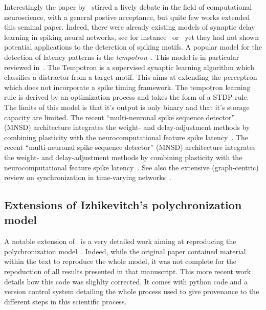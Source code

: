 \documentclass[brainsci, %
               review,submit,pdftex,moreauthors%
               ]{Definitions/mdpi}
\begin{document}
Interestingly the paper by~\citet{izhikevich_polychronization_2006} stirred a lively debate in the field of computational neuroscience, with a general postive acceptance, but quite few works extended this seminal paper.
Indeed, there were already existing models of synaptic delay learning in spiking neural networks, see for instance~\citep{huning_synaptic_1998} or~\citep{eurich_dynamics_1999} yet they had not shown potential applications to the deterction of spiking motifs. A popular model for the detection of latency patterns is the \emph{tempotron}~\citep{gutig_tempotron_2006}. This model is in particular reviewed in~\citep{gutig_spike_2014}. The Tempotron is a supervised synaptic learning algorithm which classifies a distractor from a target motif. This aims at extending the perceptron which does not incorporate a spike timing framework. The tempotron learning rule is derived by an optimization process and takes the form of a STDP rule.  The limits of this model is that it's output is only binary and that it's storage capacity are limited.
The recent ``multi-neuronal spike sequence detector'' (MNSD) architecture integrates the weight- and delay-adjustment methods by combining plasticity with the neurocomputational feature spike latency~\citep{susi_nmnsd-spiking_2021}.
The recent ``multi-neuronal spike sequence detector'' (MNSD) architecture integrates the weight- and delay-adjustment methods by combining plasticity with the neurocomputational feature spike latency~\citep{susi_nmnsd-spiking_2021}. See also the extensive (graph-centric) review on synchronization in time-varying networks~\citep{ghosh_synchronized_2022}.


\subsection{Extensions of Izhikevitch's polychronization model}
%
A notable extension of~\citep{izhikevich_polychronization_2006} is a very detailed work aiming at reproducing the polychronization model~\citep{pauli_reproducing_2018}. Indeed, while the original paper contained material within the text to reproduce the whole model, it was not complete for the repoduction of all results presented in that manuscript. This more recent work details how this code was slighlty corrected. It comes with python code and a version control system detailing the whole process used to give provenance to the different steps in this scientific process.
\end{document}
